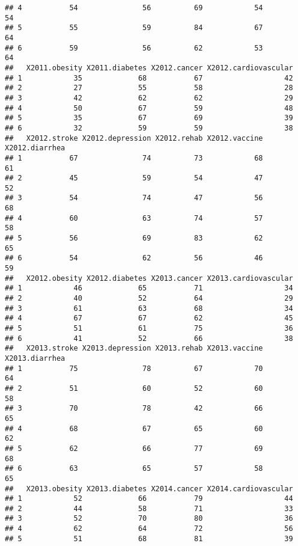 \documentclass[]{article}
\begin{document}
\begin{verbatim}
## 4           54               56          69            54             54
## 5           55               59          84            67             64
## 6           59               56          62            53             64
##   X2011.obesity X2011.diabetes X2012.cancer X2012.cardiovascular
## 1            35             68           67                   42
## 2            27             55           58                   28
## 3            42             62           62                   29
## 4            50             67           59                   48
## 5            35             67           69                   39
## 6            32             59           59                   38
##   X2012.stroke X2012.depression X2012.rehab X2012.vaccine X2012.diarrhea
## 1           67               74          73            68             61
## 2           45               59          54            47             52
## 3           54               74          47            56             68
## 4           60               63          74            57             58
## 5           56               69          83            62             65
## 6           54               62          56            46             59
##   X2012.obesity X2012.diabetes X2013.cancer X2013.cardiovascular
## 1            46             65           71                   34
## 2            40             52           64                   29
## 3            61             63           68                   34
## 4            67             67           62                   45
## 5            51             61           75                   36
## 6            41             52           66                   38
##   X2013.stroke X2013.depression X2013.rehab X2013.vaccine X2013.diarrhea
## 1           75               78          67            70             64
## 2           51               60          52            60             58
## 3           70               78          42            66             65
## 4           68               67          65            60             62
## 5           62               66          77            69             68
## 6           63               65          57            58             65
##   X2013.obesity X2013.diabetes X2014.cancer X2014.cardiovascular
## 1            52             66           79                   44
## 2            44             58           71                   33
## 3            52             70           80                   36
## 4            62             64           72                   56
## 5            51             68           81                   39

\end{verbatim}
\end{document}
